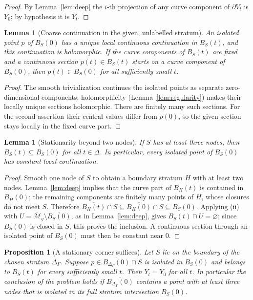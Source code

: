 \documentclass[12pt]{article}
\newcommand{\M}{\mathcal M}
\newcommand{\cl}[1]{\overline{#1}}
\newtheorem{lemma}[theorem]{Lemma}
\newtheorem{proposition}[theorem]{Proposition}
\theoremstyle{remark}
\begin{document}
\begin{proof}
By Lemma~\ref{lem:deep} the \(i\)-th projection of any curve
component of \(\partial V_t\) is \(Y_0\); by hypothesis it is \(Y_t\).
\end{proof}

\begin{lemma}[Coarse continuation in the given, unlabelled stratum]
\label{lem:isolated}
An isolated point \(p\) of \(B_S(0)\) has a unique local continuous
continuation in \(B_S(t)\), and this continuation is holomorphic.
If the curve components of \(B_S(t)\) are fixed and a continuous
section \(p(t)\in B_S(t)\) starts on a curve component of \(B_S(0)\),
then \(p(t)\in B_S(0)\) for all sufficiently small \(t\).
\end{lemma}

\begin{proof}
The smooth trivialization continues the isolated points as
separate zero-dimensional components; holomorphicity
(Lemma~\ref{lem:regularity}) makes their locally unique sections
holomorphic. There are finitely many such sections. For the second
assertion their central values differ from \(p(0)\), so the given
section stays locally in the fixed curve part.
\end{proof}

\begin{lemma}[Stationarity beyond two nodes]\label{lem:deep-points}
If \(S\) has at least three nodes, then
\(B_S(t)\subseteq B_S(0)\) for all \(t\in\Delta\).
In particular, every isolated point of \(B_S(0)\) has constant
local continuation.
\end{lemma}

\begin{proof}
Smooth one node of \(S\) to obtain a boundary stratum \(H\) with at
least two nodes. Lemma~\ref{lem:deep} implies that the curve part
of \(B_H(t)\) is contained in \(B_H(0)\); the remaining components
are finitely many points of \(H\), whose closures do not meet \(S\).
Therefore
\(\cl{B_H(t)}\cap S\subseteq\cl{B_H(0)}\cap S\subseteq B_S(0)\).
Applying (ii) with \(U=\cl{\M}_g\setminus\cl{B_S(0)}\), as in
Lemma~\ref{lem:deep}, gives \(B_S(t)\cap U=\varnothing\); since
\(B_S(0)\) is closed in \(S\), this proves the inclusion.
A continuous section through an isolated point of \(B_S(0)\)
must then be constant near \(0\).
\end{proof}

\begin{proposition}[A stationary corner suffices]\label{prop:fixed-cusp}
Let \(S\) lie on the boundary of the chosen stratum
\(\Delta_\Gamma\). Suppose
\(p\in\cl{B_{\Delta_\Gamma}(0)}\cap S\)
is isolated in \(B_S(0)\) and belongs to \(B_S(t)\) for every
sufficiently small \(t\). Then \(Y_t=Y_0\) for all \(t\). In
particular the conclusion of the problem holds if
\(\cl{B_{\Delta_\Gamma}(0)}\) contains a point with at least three
nodes that is isolated in its full stratum intersection \(B_S(0)\).
\end{proposition}
\end{document}
